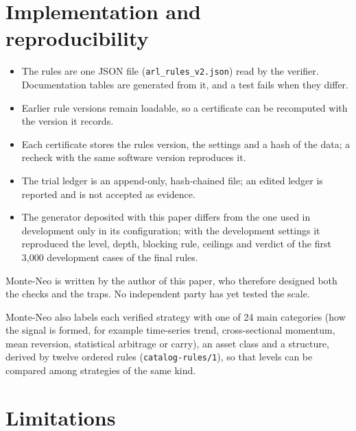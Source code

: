 \documentclass[11pt]{article}
\begin{document}
\section{Implementation and reproducibility}\label{sec:impl}

\begin{itemize}
\item The rules are one JSON file (\texttt{arl\_rules\_v2.json}) read by the verifier. Documentation tables are generated
from it, and a test fails when they differ.
\item Earlier rule versions remain loadable, so a certificate can be recomputed with the version it records.
\item Each certificate stores the rules version, the settings and a hash of the data; a recheck with the same software
version reproduces it.
\item The trial ledger is an append-only, hash-chained file; an edited ledger is reported and is not accepted as
evidence.
\item The generator deposited with this paper differs from the one used in development only in its configuration; with
the development settings it reproduced the level, depth, blocking rule, ceilings and verdict of the first 3,000
development cases of the final rules.
\end{itemize}
Monte-Neo is written by the author of this paper, who therefore designed both the checks and the traps. No independent
party has yet tested the scale.

Monte-Neo also labels each verified strategy with one of 24 main categories (how the signal is formed, for example
time-series trend, cross-sectional momentum, mean reversion, statistical arbitrage or carry), an asset class and a
structure, derived by twelve ordered rules (\texttt{catalog-rules/1}), so that levels can be compared among strategies of
the same kind.

\section{Limitations}
\end{document}
